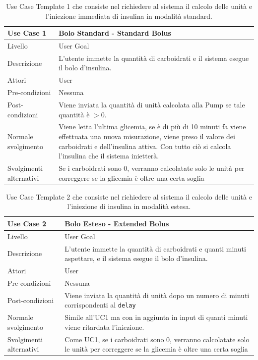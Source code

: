 \documentclass[twocolumn]{article}
\begin{document}
\null\vfill
\begin{table}[!htbp]
\centering
\captionsetup{justification=centering}
\begin{tabular}{|p{4.5cm}|p{9.5cm}|}
    \hline
    Use Case 1 & Bolo Standard - Standard Bolus\\
    \hline
    Livello & User Goal \\
    \hline
    Descrizione & L'utente immette la quantità di carboidrati e il sistema esegue il bolo d'insulina.\\
    \hline
    Attori & User \\
    \hline
    Pre-condizioni & Nessuna\\
    \hline
    Post-condizioni & Viene inviata la quantità di unità calcolata alla Pump se tale quantità è $> 0$.\\
    \hline
    Normale svolgimento & Viene letta l'ultima glicemia, se è di più di 10 minuti fa viene effettuata una nuova misurazione, viene preso il valore dei carboidrati e dell'insulina attiva. Con tutto ciò si calcola l'insulina che il sistema inietterà.\\
    \hline
    Svolgimenti alternativi & Se i carboidrati sono 0, verranno calcolatate solo le unità per correggere se la glicemia è oltre una certa soglia \\
    \hline
\end{tabular}
\caption{Use Case Template 1 che consiste nel richiedere al sistema il calcolo delle unità e l'iniezione immediata di insulina in modalità standard.}
\label{tab:uc1}
\end{table}
\vfill\null

\begin{table}
    \centering
    \captionsetup{justification=centering}
    \begin{tabular}{|p{4.5cm}|p{9.5cm}|}
        \hline
        Use Case 2 & Bolo Esteso - Extended Bolus\\
        \hline
        Livello & User Goal \\
        \hline
        Descrizione & L'utente immette la quantità di carboidrati e quanti minuti aspettare, e il sistema esegue il bolo d'insulina.\\
        \hline
        Attori & User \\
        \hline
        Pre-condizioni & Nessuna\\
        \hline
        Post-condizioni & Viene inviata la quantità di unità dopo un numero di minuti corrispondenti al \texttt{delay} \\
        \hline
        Normale svolgimento & Simile all'UC1 ma con in aggiunta in input di quanti minuti viene ritardata l'iniezione.\\
        \hline
        Svolgimenti alternativi & Come UC1, se i carboidrati sono 0, verranno calcolatate solo le unità per correggere se la glicemia è oltre una certa soglia \\
        \hline
    \end{tabular}
    \caption{Use Case Template 2 che consiste nel richiedere al sistema il calcolo delle unità e l'iniezione di insulina in modalità estesa.}
    \label{tab:uc2}
\end{table}
\end{document}
